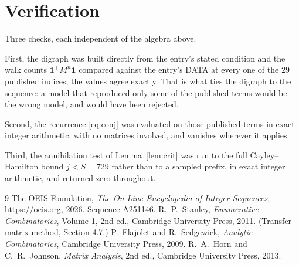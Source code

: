 \documentclass[11pt,a4paper]{article}
\theoremstyle{plain}
\theoremstyle{definition}
\begin{document}
\section{Verification}

Three checks, each independent of the algebra above.

First, the digraph was built directly from the entry's stated condition and the walk counts
$\mathbf{1}^{\!\top}M^{n}\mathbf{1}$ compared against the entry's DATA at every one of
the $29$ published indices; the values agree exactly. That is what ties the digraph to
the sequence: a model that reproduced only some of the published terms would be the wrong
model, and would have been rejected.

Second, the recurrence \eqref{eq:conj} was evaluated on those published terms in exact
integer arithmetic, with no matrices involved, and vanishes wherever it applies.

Third, the annihilation test of Lemma~\ref{lem:crit} was run to the full Cayley--Hamilton
bound $j<S=729$ rather than to a sampled prefix, in exact integer arithmetic, and returned
zero throughout.

\begin{thebibliography}{9}
 The OEIS Foundation, \emph{The On-Line Encyclopedia of Integer
Sequences}, \url{https://oeis.org}, 2026. Sequence A251146.
 R.~P.~Stanley, \emph{Enumerative Combinatorics}, Volume 1, 2nd ed.,
Cambridge University Press, 2011. (Transfer-matrix method, Section 4.7.)
 P.~Flajolet and R.~Sedgewick, \emph{Analytic Combinatorics}, Cambridge
University Press, 2009.
 R.~A.~Horn and C.~R.~Johnson, \emph{Matrix Analysis}, 2nd ed., Cambridge
University Press, 2013.
\end{thebibliography}
\end{document}
